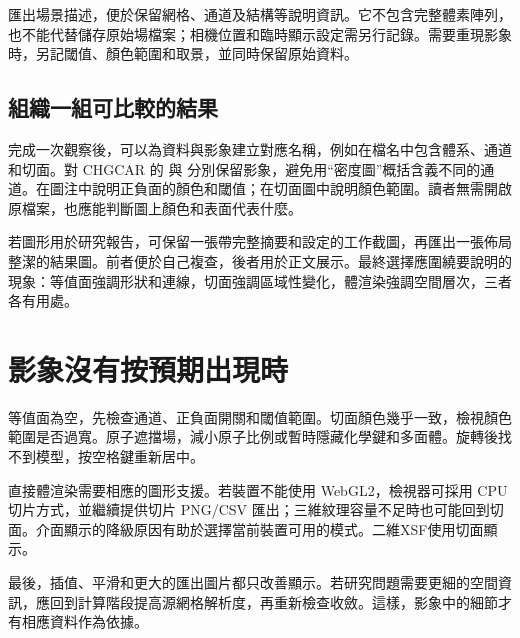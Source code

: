  匯出場景描述，便於保留網格、通道及結構等說明資訊。它不包含完整體素陣列，也不能代替儲存原始場檔案；相機位置和臨時顯示設定需另行記錄。需要重現影象時，另記閾值、顏色範圍和取景，並同時保留原始資料。

\subsection{組織一組可比較的結果}

完成一次觀察後，可以為資料與影象建立對應名稱，例如在檔名中包含體系、通道和切面。對 CHGCAR 的  與  分別保留影象，避免用“密度圖”概括含義不同的通道。在圖注中說明正負面的顏色和閾值；在切面圖中說明顏色範圍。讀者無需開啟原檔案，也應能判斷圖上顏色和表面代表什麼。

若圖形用於研究報告，可保留一張帶完整摘要和設定的工作截圖，再匯出一張佈局整潔的結果圖。前者便於自己複查，後者用於正文展示。最終選擇應圍繞要說明的現象：等值面強調形狀和連線，切面強調區域性變化，體渲染強調空間層次，三者各有用處。

\section{影象沒有按預期出現時}

等值面為空，先檢查通道、正負面開關和閾值範圍。切面顏色幾乎一致，檢視顏色範圍是否過寬。原子遮擋場，減小原子比例或暫時隱藏化學鍵和多面體。旋轉後找不到模型，按空格鍵重新居中。

直接體渲染需要相應的圖形支援。若裝置不能使用 WebGL2，檢視器可採用 CPU 切片方式，並繼續提供切片 PNG/CSV 匯出；三維紋理容量不足時也可能回到切面。介面顯示的降級原因有助於選擇當前裝置可用的模式。二維XSF使用切面顯示。

最後，插值、平滑和更大的匯出圖片都只改善顯示。若研究問題需要更細的空間資訊，應回到計算階段提高源網格解析度，再重新檢查收斂。這樣，影象中的細節才有相應資料作為依據。
